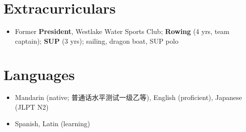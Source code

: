 \documentclass[10pt]{article}
\begin{document}
\section*{Extracurriculars}
\begin{itemize}
    \item Former \textbf{President}, Westlake Water Sports Club; \textbf{Rowing} (4 yrs, team captain); \textbf{SUP} (3 yrs); sailing, dragon boat, SUP polo
\end{itemize}

\section*{Languages}
\begin{itemize}
    \item Mandarin (native; 普通话水平测试一级乙等), English (proficient), Japanese (JLPT N2)
    \item Spanish, Latin (learning)
\end{itemize}
\end{document}

